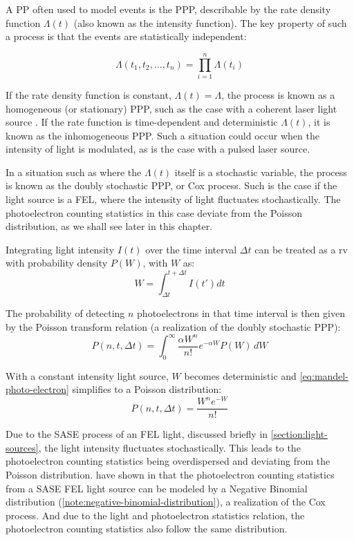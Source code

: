 A \gls{PP} often used to model events is the \gls{PPP}, describable by the rate density function $\Lambda(t)$ (also known as the intensity function). The key property of such a process is that the events are statistically independent:

\begin{equation}
    \Lambda(t_1, t_2, \dots, t_n) = \prod_{i=1}^{n} \Lambda(t_i)
\end{equation}

If the rate density function is constant, $\Lambda(t) = \Lambda$, the process is known as a homogeneous (or stationary) \gls{PPP}, such as the case with a coherent laser light source \cite{salehPhotoelectronStatistics1978}. If the rate function is time-dependent and deterministic $\Lambda(t)$, it is known as the inhomogeneous \gls{PPP}. Such a situation could occur when the intensity of light is modulated, as is the case with a pulsed laser source.

In a situation such as where the $\Lambda(t)$ itself is a stochastic variable, the process is known as the doubly stochastic \gls{PPP}, or Cox process. Such is the case if the light source is a \gls{FEL}, where the intensity of light fluctuates stochastically. The photoelectron counting statistics in this case deviate from the Poisson distribution, as we shall see later in this chapter.

Integrating light intensity $I(t)$ over the time interval $\Delta t$ can be treated as a \gls{rv} with probability density $P(W)$, with $W$ as:
\begin{equation}
    W = \int_{\Delta t}^{t+\Delta t} I(t') dt
\end{equation}

The probability of detecting $n$ photoelectrons in that time interval is then given by the Poisson transform relation \cite{mehtaVIIITheoryPhotoelectron1970} (a realization of the doubly stochastic \gls{PPP}):
\begin{equation}\label{eq:mandel-photo-electron}
    P(n, t, \Delta t) = \int_{0}^{\infty} \frac{\alpha W^n}{n!} e^{-\alpha W} P(W) \, dW
\end{equation}

With a constant intensity light source, $W$ becomes deterministic and \cref{eq:mandel-photo-electron} simplifies to a Poisson distribution:
\begin{equation}
    P(n, t, \Delta t) = \frac{W^n e^{-W}}{n!} 
\end{equation}

Due to the \gls{SASE} process of an \gls{FEL} light, discussed briefly in \cref{section:light-sources}, the light intensity fluctuates stochastically. This leads to the photoelectron counting statistics being overdispersed and deviating from the Poisson distribution. \citeauthor{saldinStatisticalPropertiesRadiation1998} have shown in \cite{saldinStatisticalPropertiesRadiation1998} that the photoelectron counting statistics from a \gls{SASE} \gls{FEL} light source can be modeled by a Negative Binomial distribution (\cref{note:negative-binomial-distribution}), a realization of the Cox process. And due to the light and photoelectron statistics relation, the photoelectron counting statistics also follow the same distribution.

